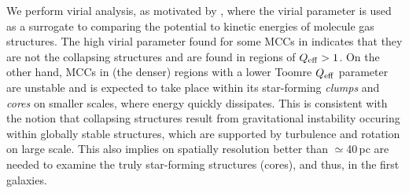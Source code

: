 \IfFileExists{emulateapjlegacy.cls}{\documentclass[iop]{emulateapjlegacy}}{\documentclass[iop]{emulateapj}}
\begin{document}
We perform virial analysis, as motivated by \obs, where the virial parameter is used as a surrogate to comparing the potential to kinetic energies of
molecule gas structures. The high virial parameter found for some MCCs in \flower
indicates that they are not the collapsing structures and are found in regions of $Q_{\rm eff}>1$.
On the other hand, MCCs in (the denser) regions with a lower Toomre $Q_{\rm eff}$ parameter are unstable
and \SF is expected to take place within its star-forming {\it clumps} and {\it cores} on smaller scales,
where energy quickly dissipates. %
This is consistent with the notion that collapsing structures result from
gravitational instability occuring within globally stable structures, which are
supported by turbulence and rotation on large scale.
This also implies \obs on spatially resolution better than $\simeq$40\,pc are needed to examine the truly star-forming structures (cores),
and thus, \SF in the first galaxies.
\end{document}

